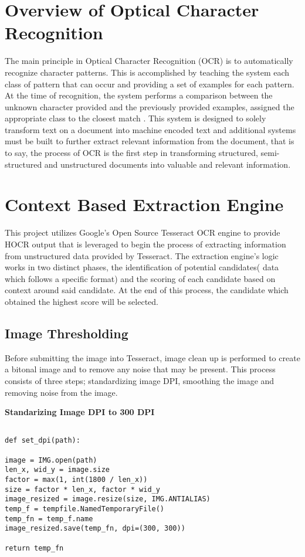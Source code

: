 \section{Overview of Optical Character Recognition}

The main principle in Optical Character Recognition (OCR) is to 
automatically recognize character patterns. This is accomplished by teaching 
the system each class of pattern that can occur and providing a set of 
examples for each pattern. At the time of recognition, the system 
performs a comparison between the unknown character provided and 
the previously provided examples, assigned the appropriate class to 
the closest match \cite{hid-sp18-414-www-eikvilocr}. This system is 
designed to solely transform text on a document into machine encoded 
text and additional systems must be built to further extract relevant information
from the document, that is to say, the process of OCR is the first step 
in transforming structured, semi-structured and unstructured documents 
into valuable and relevant information.

\section{Context Based Extraction Engine}

This project utilizes Google's Open Source Tesseract OCR engine to provide
HOCR output that is leveraged to begin the process of extracting information 
from unstructured data provided by Tesseract. The extraction engine's logic works 
in two distinct phases, the identification of potential candidates( data which follows 
a specific format) and the scoring of each candidate based on context around said 
candidate. At the end of this process, the candidate which obtained the highest 
score will be selected. 

\subsection{Image Thresholding}

Before submitting the image into Tesseract, image clean
up is performed to create a bitonal image and to remove any noise that
may be present. This process consists of three steps; standardizing 
image DPI, smoothing the image and removing noise from the
 image\cite{hid-sp18-414-www-imagethresholding}.

\bigskip
\noindent
\textbf{Standarizing Image DPI to 300 DPI}
\begin{footnotesize}
\begin{verbatim}

def set_dpi(path):

image = IMG.open(path)
len_x, wid_y = image.size
factor = max(1, int(1800 / len_x))
size = factor * len_x, factor * wid_y
image_resized = image.resize(size, IMG.ANTIALIAS)
temp_f = tempfile.NamedTemporaryFile()
temp_fn = temp_f.name
image_resized.save(temp_fn, dpi=(300, 300))

return temp_fn

\end{verbatim}
\end{footnotesize}

